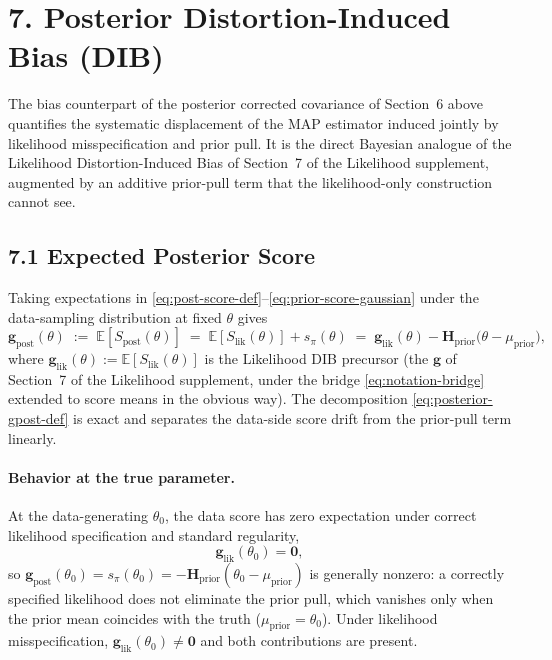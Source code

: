 \documentclass[11pt]{article}
\begin{document}
\section*{7. Posterior Distortion-Induced Bias (DIB)}

The bias counterpart of the posterior corrected covariance of Section~6 above quantifies the systematic displacement of the MAP estimator induced jointly by likelihood misspecification and prior pull. It is the direct Bayesian analogue of the Likelihood Distortion-Induced Bias of Section~7 of the Likelihood supplement, augmented by an additive prior-pull term that the likelihood-only construction cannot see.

\subsection*{7.1 Expected Posterior Score}

Taking expectations in \eqref{eq:post-score-def}--\eqref{eq:prior-score-gaussian} under the data-sampling distribution at fixed $\theta$ gives
\begin{equation}
\mathbf g_{\mathrm{post}}(\theta)
\;:=\;
\mathbb{E}[S_{\mathrm{post}}(\theta)]
\;=\;
\mathbb{E}[S_{\mathrm{lik}}(\theta)] + s_\pi(\theta)
\;=\;
\mathbf g_{\mathrm{lik}}(\theta)
- \mathbf H_{\mathrm{prior}}\bigl(\theta - \mu_{\mathrm{prior}}\bigr),
\label{eq:posterior-gpost-def}
\end{equation}
where $\mathbf g_{\mathrm{lik}}(\theta) := \mathbb{E}[S_{\mathrm{lik}}(\theta)]$ is the Likelihood DIB precursor (the $\mathbf g$ of Section~7 of the Likelihood supplement, under the bridge \eqref{eq:notation-bridge} extended to score means in the obvious way). The decomposition \eqref{eq:posterior-gpost-def} is exact and separates the data-side score drift from the prior-pull term linearly.

\paragraph{Behavior at the true parameter.}
At the data-generating $\theta_0$, the data score has zero expectation under correct likelihood specification and standard regularity,
\begin{equation}
\mathbf g_{\mathrm{lik}}(\theta_0) = \mathbf 0,
\label{eq:posterior-glik-true-zero}
\end{equation}
so $\mathbf g_{\mathrm{post}}(\theta_0) = s_\pi(\theta_0) = -\mathbf H_{\mathrm{prior}}(\theta_0 - \mu_{\mathrm{prior}})$ is generally nonzero: a correctly specified likelihood does not eliminate the prior pull, which vanishes only when the prior mean coincides with the truth ($\mu_{\mathrm{prior}} = \theta_0$). Under likelihood misspecification, $\mathbf g_{\mathrm{lik}}(\theta_0) \neq \mathbf 0$ and both contributions are present.
\end{document}
